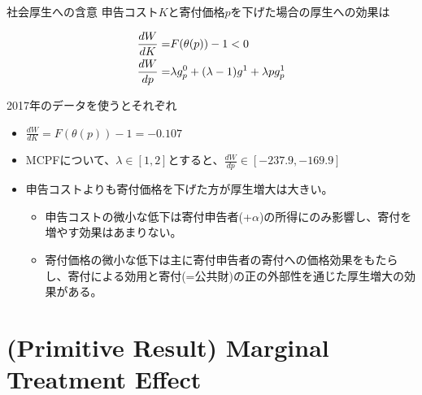 \documentclass[
  ignorenonframetext,
  aspectratio=169,
]{beamer}
\providecommand{\tightlist}{%
  \setlength{\itemsep}{0pt}\setlength{\parskip}{0pt}}
\begin{document}
\begin{frame}{社会厚生への含意}
\protect\hypertarget{ux793eux4f1aux539aux751fux3078ux306eux542bux610f-1}{}
申告コスト\(K\)と寄付価格\(p\)を下げた場合の厚生への効果は

\begin{align}
  \frac{dW}{dK}=&F(\theta(p))-1<0\notag\\
  \frac{dW}{dp}=&\lambda g_p^0+(\lambda-1)g^1+\lambda pg_p^1\notag
\end{align}

2017年のデータを使うとそれぞれ

\begin{itemize}
\tightlist
\item
  \(\frac{dW}{dK}=F(\theta(p))-1=-0.107\)
\item
  MCPFについて、\(\lambda\in[1,2]\)とすると、\(\frac{dW}{dp}\in[-237.9, -169.9]\)
\item
  申告コストよりも寄付価格を下げた方が厚生増大は大きい。

  \begin{itemize}
  \tightlist
  \item
    申告コストの微小な低下は寄付申告者(+\(\alpha\))の所得にのみ影響し、寄付を増やす効果はあまりない。
  \item
    寄付価格の微小な低下は主に寄付申告者の寄付への価格効果をもたらし、寄付による効用と寄付(=公共財)の正の外部性を通じた厚生増大の効果がある。
  \end{itemize}
\end{itemize}
\end{frame}

\hypertarget{primitive-result-marginal-treatment-effect}{%
\section{(Primitive Result) Marginal Treatment Effect}\label{primitive-result-marginal-treatment-effect}}
\end{document}
